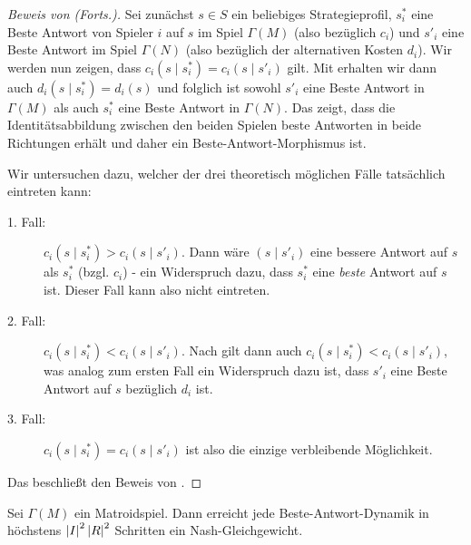 \begin{proof}[Beweis von  (Forts.)]
	Sei zunächst $s \in S$ ein beliebiges Strategieprofil, $s^\ast_i$ eine Beste Antwort von Spieler $i$ auf $s$ im Spiel $\Gamma(M)$ (also bezüglich $c_i$) und $s'_i$ eine Beste Antwort im Spiel $\Gamma(N)$ (also bezüglich der alternativen Kosten $d_i$). Wir werden nun zeigen, dass $c_i(s \mid s^\ast_i) = c_i(s \mid s'_i)$ gilt. Mit  erhalten wir dann auch $d_i(s \mid s^\ast_i) = d_i(s)$ und folglich ist sowohl $s'_i$ eine Beste Antwort in $\Gamma(M)$ als auch $s^\ast_i$ eine Beste Antwort in $\Gamma(N)$. Das zeigt, dass die Identitätsabbildung zwischen den beiden Spielen beste Antworten in beide Richtungen erhält und daher ein Beste-Antwort-Morphismus ist. 
	
	Wir untersuchen dazu, welcher der drei theoretisch möglichen Fälle tatsächlich eintreten kann:
	\begin{description}
		\item[1. Fall:] $c_i(s \mid s^\ast_i) > c_i(s \mid s'_i)$. Dann wäre $(s \mid s'_i)$ eine bessere Antwort auf $s$ als $s^\ast_i$ (bzgl. $c_i$) - ein Widerspruch dazu, dass $s^\ast_i$ eine \emph{beste} Antwort auf $s$ ist. Dieser Fall kann also nicht eintreten.
		\item[2. Fall:] $c_i(s \mid s^\ast_i) < c_i(s \mid s'_i)$. Nach  gilt dann auch $c_i(s \mid s^\ast_i) < c_i(s \mid s'_i)$, was analog zum ersten Fall ein Widerspruch dazu ist, dass $s'_i$ eine Beste Antwort auf $s$ bezüglich $d_i$ ist.
		\item[3. Fall:] $c_i(s \mid s^\ast_i) = c_i(s \mid s'_i)$ ist also die einzige verbleibende Möglichkeit.
	\end{description}
	Das beschließt den Beweis von .
\end{proof}

\begin{kor}\label{kor:BA-DynamikInMatroidSpielen}
	Sei $\Gamma(M)$ ein Matroidspiel. Dann erreicht jede Beste-Antwort-Dynamik in höchstens $\left|I\right|^2\left|R\right|^2$ Schritten ein Nash-Gleichgewicht.
\end{kor}

